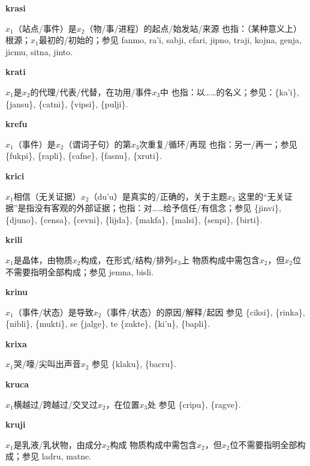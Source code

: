 \documentclass[notitlepage,twocolumn,a4paper,10pt]{book}
\begin{document}
{\sffamily\bfseries krasi}\enspace {\ttfamily\bfseries[    kra]}  $x_1$（站点\slash{}事件）是$x_2$（物\slash{}事\slash{}进程）的起点\slash{}始发站\slash{}来源 \textemdash{} 也指：（某种意义上）根源；$x_1$最初的\slash{}初始的；参见 {fanmo}, {ra'i}, {sabji}, {cfari}, {jipno}, {traji}, {kojna}, {genja}, {jicmu}, {sitna}, {jinto}.

{\sffamily\bfseries krati}\enspace {\ttfamily\bfseries[        ka'i]}  $x_1$是$x_2$的代理\slash{}代表\slash{}代替，在功用\slash{}事件$x_3$中 \textemdash{} 也指：以……的名义；参见：\{ka'i\}, \{jansu\}, \{catni\}, \{vipsi\}, \{pulji\}.

{\sffamily\bfseries krefu}\enspace {\ttfamily\bfseries[ref     ke'u]}  $x_1$（事件）是$x_2$（谓词子句）的第$x_3$次重复\slash{}循环\slash{}再现 \textemdash{} 也指：另一\slash{}再一；参见 \{fukpi\}, \{rapli\}, \{cafne\}, \{fasnu\}, \{xruti\}.

{\sffamily\bfseries krici}\enspace {\ttfamily\bfseries[    kri]}  $x_1$相信（无关证据）$x_2$（du'u）是真实的\slash{}正确的，关于主题$x_3$ \textemdash{} 这里的“无关证据”是指没有客观的外部证据；也指：对……给予信任\slash{}有信念；参见 \{jinvi\}, \{djuno\}, \{censa\}, \{cevni\}, \{lijda\}, \{makfa\}, \{malsi\}, \{senpi\}, \{birti\}.

{\sffamily\bfseries krili} $x_1$是晶体，由物质$x_2$构成，在形式\slash{}结构\slash{}排列$x_3$上 \textemdash{} 物质构成中需包含$x_2$，但$x_2$位不需要指明全部构成；参见 {jemna}, {bisli}.

{\sffamily\bfseries krinu}\enspace {\ttfamily\bfseries[rin     ki'u]}  $x_1$（事件\slash{}状态）是导致$x_2$（事件\slash{}状态）的原因\slash{}解释\slash{}起因 \textemdash{} 参见 \{ciksi\}, \{rinka\}, \{nibli\}, \{mukti\}, se \{jalge\}, te \{zukte\}, \{ki'u\}, \{bapli\}.

{\sffamily\bfseries krixa}\enspace {\ttfamily\bfseries[kix     ki'a]}  $x_1$哭\slash{}嚎\slash{}尖叫出声音$x_2$ \textemdash{} 参见 \{klaku\}, \{bacru\}.

{\sffamily\bfseries kruca}\enspace {\ttfamily\bfseries[kuc]}  $x_1$横越过\slash{}跨越过\slash{}交叉过$x_2$，在位置$x_3$处 \textemdash{} 参见 \{cripu\}, \{ragve\}.

{\sffamily\bfseries kruji}\enspace {\ttfamily\bfseries[ruj]}  $x_1$是乳液\slash{}乳状物，由成分$x_2$构成 \textemdash{} 物质构成中需包含$x_2$，但$x_2$位不需要指明全部构成；参见 {ladru}, {matne}.
\end{document}
